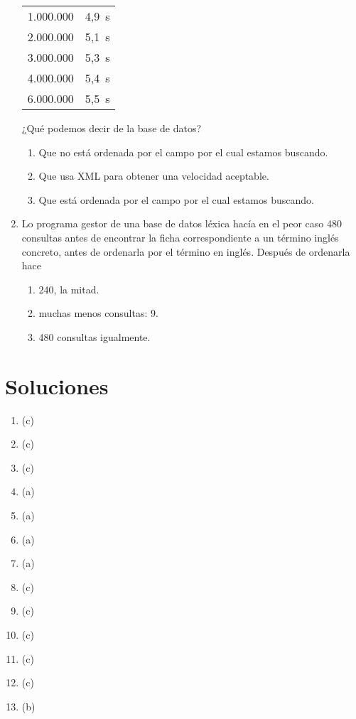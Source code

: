 \begin{enumerate}
\begin{center}
\begin{tabular}{c|c}
1.000.000 &4,9~s \\ 2.000.000 &5,1~s \\ 3.000.000 &5,3~s \\ 4.000.000 &5,4~s \\ 6.000.000 &5,5~s \\ \hline

\end{tabular} \end{center} ¿Qué podemos decir de la base de datos? \begin{enumerate} \item Que no está ordenada por el campo por el cual estamos buscando. \item Que usa XML para obtener una velocidad aceptable. \item Que está ordenada por el campo por el cual estamos buscando. \end{enumerate} 

\item Lo programa gestor de una base de datos léxica hacía en el peor caso 480 consultas antes de encontrar la ficha correspondiente a un término inglés concreto, antes de ordenarla por el término en inglés. Después de ordenarla hace \begin{enumerate} \item 240, la mitad. \item muchas menos consultas: 9. \item 480 consultas igualmente. \end{enumerate} \end{enumerate} 

\section{Soluciones}  \begin{enumerate} \item (c) \item (c) \item (c) \item (a) \item (a) 

\item (a) \item (a) \item (c) \item (c) \item (c) 

\item (c) \item (c) \item (b) \end{enumerate} 